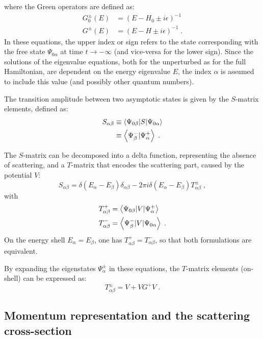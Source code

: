 where the Green operators are defined as:
\begin{align*}
  G^\pm_0(E) &= (E-H_0\pm i\epsilon )^{-1}  \\
  G^\pm (E) &= (E-H\pm i\epsilon )^{-1} \; .
\end{align*}
In these equations, the upper index or sign refers to the state corresponding with the free state $\Psi_{0\alpha}$ at time $t\rightarrow - \infty$ (and vice-versa for the lower sign). Since the solutions of the eigenvalue equations, both for the unperturbed as for the full Hamiltonian, are dependent on the energy eigenvalue $E$, the index $\alpha$ is assumed to include this value (and possibly other quantum numbers).

The transition amplitude between two asymptotic states is given by the $S$-matrix elements, defined as:
\begin{align}
  S_{\alpha\beta} &\equiv \left\langle \Psi_{0\beta} \vert S \vert \Psi_{0\alpha} \right\rangle \nonumber\\
  & \equiv \left\langle \Psi_\beta^- \vert \Psi_\alpha^+ \right\rangle \; .
  \label{<++>}
\end{align}

The $S$-matrix can be decomposed into a delta function, representing the absence of scattering, and a $T$-matrix that encodes the scattering part, caused by the potential $V$:
\begin{equation*}
  S_{\alpha\beta} = \delta (E_\alpha - E_\beta)\delta_{\alpha\beta} - 2\pi i \delta (E_\alpha - E_\beta) T^\pm_{\alpha\beta} \; ,
\end{equation*}
with
\begin{align*}
  T^+_{\alpha\beta} & = \left\langle \Psi_{0\beta} \vert V \vert \Psi^+_\alpha \right\rangle \\
  T^-_{\alpha\beta} & = \left\langle \Psi^-_\beta \vert V \vert \Psi_{0\alpha} \right\rangle \; .
\end{align*}
On the energy shell $E_\alpha = E_\beta$, one has $T^+_{\alpha\beta}= T^-_{\alpha\beta}$, so that both formulations are equivalent.

By expanding the eigenstates $\Psi^\pm_\alpha$ in these equations, the $T$-matrix elements (on-shell) can be expressed as:
\begin{equation*}
  T^\pm_{\alpha\beta} = V + VG^+ V \; .
\end{equation*}


\subsection{Momentum representation and the scattering cross-section}

